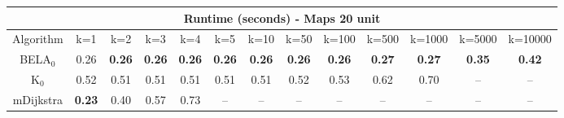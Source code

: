 \begin{tabular}{c|cccccccccccc}\toprule
\multicolumn{13}{c}{Runtime (seconds) - Maps 20 unit}\\ \midrule
Algorithm & k=1 & k=2 & k=3 & k=4 & k=5 & k=10 & k=50 & k=100 & k=500 & k=1000 & k=5000 & k=10000 \\ \midrule
BELA$_0$ & 0.26 & \textbf{0.26} & \textbf{0.26} & \textbf{0.26} & \textbf{0.26} & \textbf{0.26} & \textbf{0.26} & \textbf{0.26} & \textbf{0.27} & \textbf{0.27} & \textbf{0.35} & \textbf{0.42} \\
K$_0$ & 0.52 & 0.51 & 0.51 & 0.51 & 0.51 & 0.51 & 0.52 & 0.53 & 0.62 & 0.70 & -- & -- \\
mDijkstra & \textbf{0.23} & 0.40 & 0.57 & 0.73 & -- & -- & -- & -- & -- & -- & -- & -- \\ \bottomrule 
\end{tabular}
